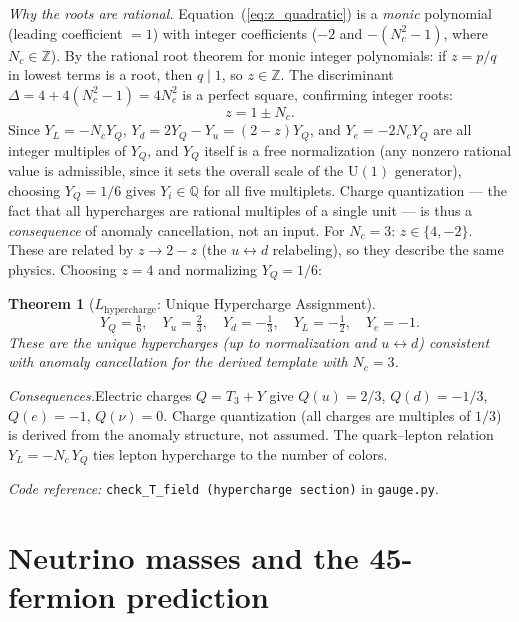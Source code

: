 \documentclass[11pt,a4paper]{article}
\newtheorem{theorem}{Theorem}[section]
\theoremstyle{definition}
\newcommand{\U}{\mathrm{U}}
\newcommand{\coderef}[2]{\smallskip\noindent\textit{Code reference:} \texttt{#1} in \texttt{#2}.}
\begin{document}
\noindent\textit{Why the roots are rational.}\quad
Equation~(\ref{eq:z_quadratic}) is a \emph{monic} polynomial (leading
coefficient $= 1$) with integer coefficients ($-2$ and $-(N_c^2-1)$,
where $N_c \in \mathbb{Z}$).  By the rational root theorem for monic
integer polynomials: if $z = p/q$ in lowest terms is a root, then
$q \mid 1$, so $z \in \mathbb{Z}$.  The discriminant
$\Delta = 4 + 4(N_c^2 - 1) = 4N_c^2$ is a perfect square, confirming
integer roots:
\begin{equation}
  z = 1 \pm N_c.
\end{equation}
Since $Y_L = -N_c Y_Q$, $Y_d = 2Y_Q - Y_u = (2-z)Y_Q$, and
$Y_e = -2N_c Y_Q$ are all integer multiples of $Y_Q$, and $Y_Q$ itself
is a free normalization (any nonzero rational value is admissible, since
it sets the overall scale of the $\U(1)$ generator), choosing
$Y_Q = 1/6$ gives $Y_i \in \mathbb{Q}$ for all five multiplets.
Charge quantization --- the fact that all hypercharges are rational
multiples of a single unit --- is thus a \emph{consequence} of anomaly
cancellation, not an input.
For $N_c = 3$: $z \in \{4, -2\}$.  These are related by
$z \to 2 - z$ (the $u \leftrightarrow d$ relabeling), so they describe
the same physics.  Choosing $z = 4$ and normalizing $Y_Q = 1/6$:

\begin{theorem}[$L_{\mathrm{hypercharge}}$: Unique Hypercharge Assignment]
\label{thm:hypercharge}
\[
  Y_Q = \tfrac{1}{6}, \quad
  Y_u = \tfrac{2}{3}, \quad
  Y_d = -\tfrac{1}{3}, \quad
  Y_L = -\tfrac{1}{2}, \quad
  Y_e = -1.
\]
These are the unique hypercharges (up to normalization and $u \leftrightarrow d$)
consistent with anomaly cancellation for the derived template with $N_c = 3$.
\end{theorem}

\noindent\textit{Consequences.}\quad Electric charges $Q = T_3 + Y$ give
$Q(u) = 2/3$, $Q(d) = -1/3$, $Q(e) = -1$, $Q(\nu) = 0$.  Charge
quantization (all charges are multiples of $1/3$) is derived from the
anomaly structure, not assumed.  The quark--lepton relation
$Y_L = -N_c\, Y_Q$ ties lepton hypercharge to the number of colors.

\coderef{check\_T\_field (hypercharge section)}{gauge.py}


\newpage


\section{Neutrino masses and the 45-fermion prediction}
\label{sec:neutrinos}
\end{document}
